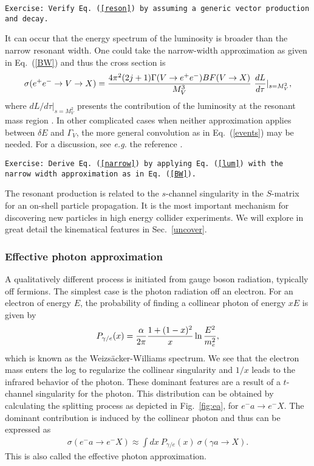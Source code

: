 \documentclass[prd,aps,floats,preprintnumbers,preprint,superscriptaddress,floatfix,nofootinbib]{revtex4}
\def\epem{e^+e^-}
\def\bea{\begin{eqnarray}}
\def\eea{\end{eqnarray}}
\begin{document}
{
\vskip 0.2cm
\noindent
\tt Exercise: Verify Eq.~(\ref{reson}) by assuming a generic vector production and decay.
\vskip 0.2cm
}

It can occur that the energy spectrum of the luminosity is broader than the narrow
resonant width. One could take the narrow-width approximation as given in
Eq.~(\ref{BW}) and thus the cross section is 
\bea
\sigma(e^+e^-\to V \to X) 
= \frac{4\pi^2 (2j+1)\Gamma(V\to \epem) BF(V\to X)} { M_V^3} \ 
{dL\over d\tau}|_{s=M_V^2},
\label{narrow}
\eea 
where $dL/ d\tau|_{s=M_V^2}$ presents the  contribution
of the luminosity at the resonant mass region . 
In other complicated cases when neither approximation applies between
$\delta E$ and $\Gamma_V$, the more general convolution 
as in Eq.~(\ref{events})
may be needed. For a discussion, see {\it e.g.} the reference \cite{muon}.

{
\vskip 0.2cm
\noindent
\tt Exercise: Derive Eq.~(\ref{narrow}) by applying Eq.~(\ref{lum}) with the narrow 
 width approximation as in Eq.~(\ref{BW}).
\vskip 0.2cm
}

The resonant production is related to the $s$-channel singularity in the 
$S$-matrix for an on-shell  particle propagation. 
It is the most important mechanism for discovering
new particles in high energy collider experiments. We will explore in
great detail the kinematical features in Sec.~\ref{uncover}.

\subsubsection{Effective photon approximation}
\label{WW}

A qualitatively different process is initiated from gauge boson radiation,
typically off fermions.  
The simplest case is the photon radiation off an electron. For an electron
of energy $E$, the probability of finding a collinear photon of energy $xE$
is given by 
\bea
P_{\gamma/e}(x)  = \frac{\alpha}{ 2\pi}{ 1+(1-x)^2\over  x} \ln{E^2\over m^2_e},
\label{eq:WW}
\eea
which is known as the Weizs\"acker-Williams spectrum. We see that the
electron mass enters the log to regularize the collinear singularity and $1/x$
leads to the infrared behavior of the photon. 
These dominant features  are a result of a $t$-channel singularity
for the photon. 
This distribution can be obtained by calculating the splitting process
as depicted in Fig.~\ref{fig:ea}, for $e^- a\to e^- X$. 
The dominant contribution is induced by the collinear photon
and thus can be expressed as
\bea
\sigma(e^-a\to e^-X) \approx \int dx\  P_{\gamma/e}(x)\  \sigma(\gamma a\to X).
\label{epa}
\eea
This is also called the effective photon approximation.
\end{document}
